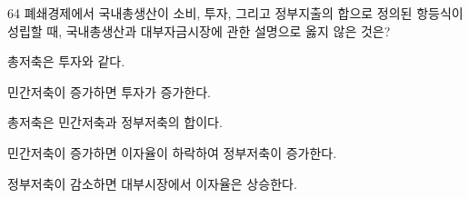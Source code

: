 \begin{question}{64}
폐쇄경제에서 국내총생산이 소비, 투자, 그리고 정부지출의 합으로 정의된 항등식이 성립할 때, 국내총생산과 대부자금시장에 관한 설명으로 옳지 않은 것은?
\begin{choices}
  \item 총저축은 투자와 같다.
  \item 민간저축이 증가하면 투자가 증가한다.
  \item 총저축은 민간저축과 정부저축의 합이다.
  \item 민간저축이 증가하면 이자율이 하락하여 정부저축이 증가한다.
  \item 정부저축이 감소하면 대부시장에서 이자율은 상승한다.
\end{choices}
\end{question}
